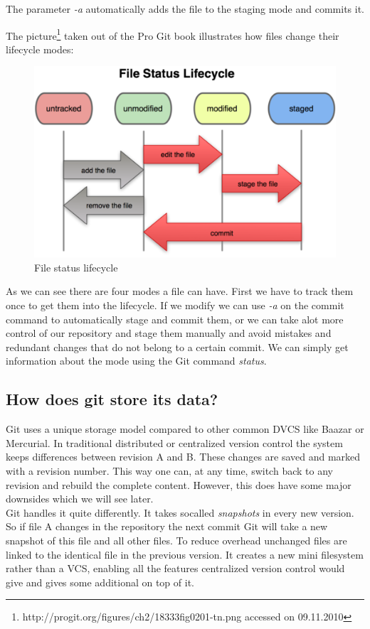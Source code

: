 The parameter \emph{-a} automatically adds the file to the staging mode and
commits it. \cite[chapter 2.2]{gitpro2009}

The picture\footnote{http://progit.org/figures/ch2/18333fig0201-tn.png accessed on 
09.11.2010} taken out of the Pro Git book illustrates how files change their
lifecycle modes:

\begin{figure}[h]
  \centering
  \includegraphics{img/file_status_lifecycle}
  \caption{File status lifecycle}
  \label{fig:File status lifecycle}
  
\end{figure} 

As we can see there are four modes a file can have. First we have to track them
once to get them into the lifecycle. If we modify we can use \emph{-a} on the
commit command to automatically stage and commit them, or we can take alot more
control of our repository and stage them manually and avoid mistakes and
redundant changes that do not belong to a certain commit.
We can simply get information about the mode using the Git command
\emph{status}. \cite[chapter 2.2]{gitpro2009} 

\subsection{How does git store its data?}
Git uses a unique storage model compared to other common DVCS like Baazar or Mercurial. 
In traditional distributed or centralized version control the system keeps differences between revision A and B. 
These changes are saved and marked with a revision number. 
This way one can, at any time, switch back to any revision and rebuild the complete content.
However, this does have some major downsides which we will see later. \\
Git handles it quite differently. It takes socalled \emph{snapshots} in every
new version. So if file A changes in the repository the next commit Git will take a new snapshot of this file and all other files. 
To reduce overhead unchanged files are linked to the identical file in the previous version. 
It creates a new mini filesystem rather than a VCS, enabling all the features centralized version 
control would give and gives some additional on top of it. \cite{gitpro2009} 

